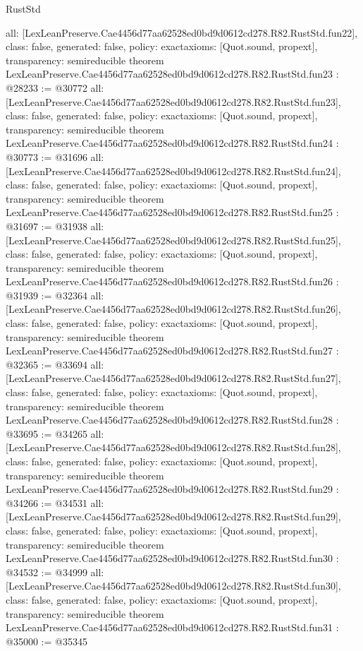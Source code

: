 \begin{lexlean}{RustStd}
\begin{coremodule}
{  all: [LexLeanPreserve.Cae4456d77aa62528ed0bd9d0612cd278.R82.RustStd.fun22],
  class: false,
  generated: false,
  policy: exact{axioms: [Quot.sound, propext]},
  transparency: semireducible
}
theorem LexLeanPreserve.Cae4456d77aa62528ed0bd9d0612cd278.R82.RustStd.fun23 : @28233 := @30772 {
  all: [LexLeanPreserve.Cae4456d77aa62528ed0bd9d0612cd278.R82.RustStd.fun23],
  class: false,
  generated: false,
  policy: exact{axioms: [Quot.sound, propext]},
  transparency: semireducible
}
theorem LexLeanPreserve.Cae4456d77aa62528ed0bd9d0612cd278.R82.RustStd.fun24 : @30773 := @31696 {
  all: [LexLeanPreserve.Cae4456d77aa62528ed0bd9d0612cd278.R82.RustStd.fun24],
  class: false,
  generated: false,
  policy: exact{axioms: [Quot.sound, propext]},
  transparency: semireducible
}
theorem LexLeanPreserve.Cae4456d77aa62528ed0bd9d0612cd278.R82.RustStd.fun25 : @31697 := @31938 {
  all: [LexLeanPreserve.Cae4456d77aa62528ed0bd9d0612cd278.R82.RustStd.fun25],
  class: false,
  generated: false,
  policy: exact{axioms: [Quot.sound, propext]},
  transparency: semireducible
}
theorem LexLeanPreserve.Cae4456d77aa62528ed0bd9d0612cd278.R82.RustStd.fun26 : @31939 := @32364 {
  all: [LexLeanPreserve.Cae4456d77aa62528ed0bd9d0612cd278.R82.RustStd.fun26],
  class: false,
  generated: false,
  policy: exact{axioms: [Quot.sound, propext]},
  transparency: semireducible
}
theorem LexLeanPreserve.Cae4456d77aa62528ed0bd9d0612cd278.R82.RustStd.fun27 : @32365 := @33694 {
  all: [LexLeanPreserve.Cae4456d77aa62528ed0bd9d0612cd278.R82.RustStd.fun27],
  class: false,
  generated: false,
  policy: exact{axioms: [Quot.sound, propext]},
  transparency: semireducible
}
theorem LexLeanPreserve.Cae4456d77aa62528ed0bd9d0612cd278.R82.RustStd.fun28 : @33695 := @34265 {
  all: [LexLeanPreserve.Cae4456d77aa62528ed0bd9d0612cd278.R82.RustStd.fun28],
  class: false,
  generated: false,
  policy: exact{axioms: [Quot.sound, propext]},
  transparency: semireducible
}
theorem LexLeanPreserve.Cae4456d77aa62528ed0bd9d0612cd278.R82.RustStd.fun29 : @34266 := @34531 {
  all: [LexLeanPreserve.Cae4456d77aa62528ed0bd9d0612cd278.R82.RustStd.fun29],
  class: false,
  generated: false,
  policy: exact{axioms: [Quot.sound, propext]},
  transparency: semireducible
}
theorem LexLeanPreserve.Cae4456d77aa62528ed0bd9d0612cd278.R82.RustStd.fun30 : @34532 := @34999 {
  all: [LexLeanPreserve.Cae4456d77aa62528ed0bd9d0612cd278.R82.RustStd.fun30],
  class: false,
  generated: false,
  policy: exact{axioms: [Quot.sound, propext]},
  transparency: semireducible
}
theorem LexLeanPreserve.Cae4456d77aa62528ed0bd9d0612cd278.R82.RustStd.fun31 : @35000 := @35345 {
}
\end{coremodule}
\end{lexlean}
